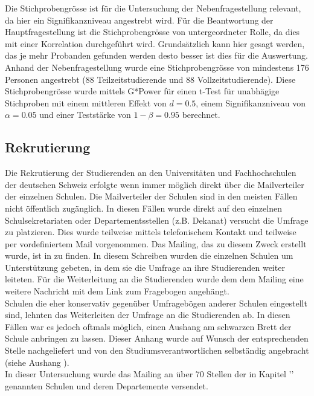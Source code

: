 Die Stichprobengrösse ist für die Untersuchung der Nebenfragestellung relevant, da hier ein Signifikanzniveau angestrebt wird. Für die Beantwortung der Hauptfragestellung ist die Stichprobengrösse von untergeordneter Rolle, da dies mit einer Korrelation durchgeführt wird. Grundsätzlich kann hier gesagt werden, das je mehr Probanden gefunden werden desto besser ist dies für die Auswertung.\\
Anhand der Nebenfragestellung wurde eine Stichprobengrösse von mindestens 176 Personen angestrebt (88 Teilzeitstudierende und 88 Vollzeitstudierende). Diese Stichprobengrösse wurde mittels G*Power für einen t-Test für unabhägige Stichproben mit einem mittleren Effekt von $d = 0.5$, einem Signifikanzniveau von $\alpha=0.05$ und einer Teststärke von $1-\beta=0.95$ berechnet.

\subsection{Rekrutierung}\label{subsection.rekrutierung}
Die Rekrutierung der Studierenden an den Universitäten und Fachhochschulen der deutschen Schweiz erfolgte wenn immer möglich direkt über die Mailverteiler der einzelnen Schulen. Die Mailverteiler der Schulen sind in den meisten Fällen nicht öffentlich zugänglich. In diesen Fällen wurde direkt auf den einzelnen Schulsekretariaten oder Departementsstellen (z.B. Dekanat) versucht die Umfrage zu platzieren. Dies wurde teilweise mittels telefonischem Kontakt und teilweise per vordefiniertem Mail vorgenommen. Das Mailing, das zu diesem Zweck erstellt wurde, ist in  zu finden. In diesem Schreiben wurden die einzelnen Schulen um Unterstützung gebeten, in dem sie die Umfrage an ihre Studierenden weiter leiteten. Für die Weiterleitung an die Studierenden wurde dem dem Mailing eine weitere Nachricht mit dem Link zum Fragebogen angehängt. \\
Schulen die eher konservativ gegenüber Umfragebögen anderer Schulen eingestellt sind, lehnten das Weiterleiten der Umfrage an die Studierenden ab. In diesen Fällen war es jedoch oftmals möglich, einen Aushang am schwarzen Brett der Schule anbringen zu lassen. Dieser Anhang wurde auf Wunsch der entsprechenden Stelle nachgeliefert und von den Studiumsverantwortlichen selbständig angebracht (siehe Aushang ). \\
In dieser Untersuchung wurde das Mailing an über 70 Stellen der in Kapitel '' genannten Schulen und deren Departemente versendet.

